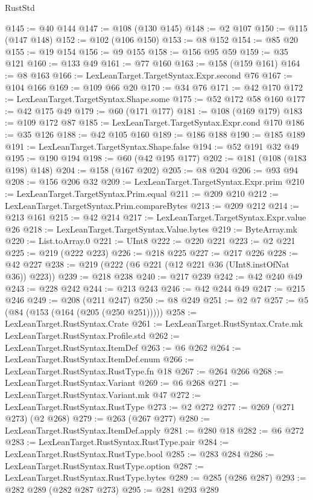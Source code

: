 \begin{lexlean}{RustStd}
\begin{coremodule}
@145 := @40 @144
@147 := @108 (@130 @145)
@148 := @2 @107
@150 := @115 (@147 @148)
@152 := @102 (@106 @150)
@153 := @8 @152
@154 := @85 @20
@155 := @19 @154
@156 := @9 @155
@158 := @156 @95 @59
@159 := @35 @121
@160 := @133 @49
@161 := @77 @160
@163 := @158 (@159 @161)
@164 := @8 @163
@166 := LexLeanTarget.TargetSyntax.Expr.second @76
@167 := @104 @166
@169 := @109 @66 @20
@170 := @34 @76
@171 := @42 @170
@172 := LexLeanTarget.TargetSyntax.Shape.some
@175 := @52 @172 @58 @160
@177 := @42 @175 @49
@179 := @60 (@171 @177)
@181 := @108 (@169 @179)
@183 := @109 @172 @87
@185 := LexLeanTarget.TargetSyntax.Expr.cond @170
@186 := @35 @126
@188 := @42 @105 @160
@189 := @186 @188
@190 := @185 @189
@191 := LexLeanTarget.TargetSyntax.Shape.false
@194 := @52 @191 @32 @49
@195 := @190 @194
@198 := @60 (@42 @195 @177)
@202 := @181 (@108 (@183 @198) @148)
@204 := @158 (@167 @202)
@205 := @8 @204
@206 := @93 @94
@208 := @156 @206 @32
@209 := LexLeanTarget.TargetSyntax.Expr.prim
@210 := LexLeanTarget.TargetSyntax.Prim.equal
@211 := @209 @210
@212 := LexLeanTarget.TargetSyntax.Prim.compareBytes
@213 := @209 @212
@214 := @213 @161
@215 := @42 @214
@217 := LexLeanTarget.TargetSyntax.Expr.value @26
@218 := LexLeanTarget.TargetSyntax.Value.bytes
@219 := ByteArray.mk
@220 := List.toArray.{0}
@221 := UInt8
@222 := @220 @221
@223 := @2 @221
@225 := @219 (@222 @223)
@226 := @218 @225
@227 := @217 @226
@228 := @42 @227
@238 := @219 (@222 (@6 @221 (@12 @221 @36 (UInt8.instOfNat @36)) @223))
@239 := @218 @238
@240 := @217 @239
@242 := @42 @240 @49
@243 := @228 @242
@244 := @213 @243
@246 := @42 @244 @49
@247 := @215 @246
@249 := @208 (@211 @247)
@250 := @8 @249
@251 := @2 @7
@257 := @5 (@84 (@153 (@164 (@205 (@250 @251)))))
@258 := LexLeanTarget.RustSyntax.Crate
@261 := LexLeanTarget.RustSyntax.Crate.mk LexLeanTarget.RustSyntax.Profile.std
@262 := LexLeanTarget.RustSyntax.ItemDef
@263 := @6 @262
@264 := LexLeanTarget.RustSyntax.ItemDef.enum
@266 := LexLeanTarget.RustSyntax.RustType.fn @18
@267 := @264 @266
@268 := LexLeanTarget.RustSyntax.Variant
@269 := @6 @268
@271 := LexLeanTarget.RustSyntax.Variant.mk @47
@272 := LexLeanTarget.RustSyntax.RustType
@273 := @2 @272
@277 := @269 (@271 @273) (@2 @268)
@279 := @263 (@267 @277)
@280 := LexLeanTarget.RustSyntax.ItemDef.apply
@281 := @280 @18
@282 := @6 @272
@283 := LexLeanTarget.RustSyntax.RustType.pair
@284 := LexLeanTarget.RustSyntax.RustType.bool
@285 := @283 @284
@286 := LexLeanTarget.RustSyntax.RustType.option
@287 := LexLeanTarget.RustSyntax.RustType.bytes
@289 := @285 (@286 @287)
@293 := @282 @289 (@282 @287 @273)
@295 := @281 @293 @289

\end{coremodule}
\end{lexlean}
